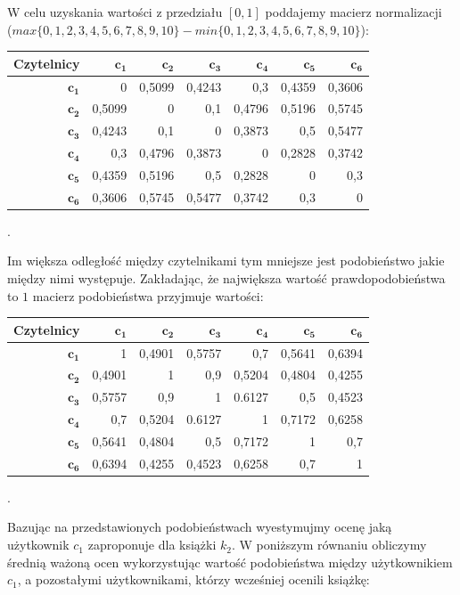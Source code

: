 \documentclass[12pt,a4paper]{report}
\begin{document}
W celu uzyskania wartości z przedziału $[0,1]$ poddajemy macierz normalizacji 
\\($max\{0,1,2,3,4,5,6,7,8,9,10\} - min\{0,1,2,3,4,5,6,7,8,9,10\}$):
\begin{center}
\begin{tabular}{|r|r|r|r|r|r|r|} \hline
\textbf{Czytelnicy} & $\mathbf{c_1}$ & $\mathbf{c_2}$ & $\mathbf{c_3}$ & $\mathbf{c_4}$ & $\mathbf{c_5}$ & $\mathbf{c_6}$\\
\hline
$\mathbf{c_1}$ & 0 & 0,5099 & 0,4243 & 0,3 & 0,4359 & 0,3606 \\
\hline
$\mathbf{c_2}$ & 0,5099 & 0 & 0,1 & 0,4796 & 0,5196 & 0,5745\\
\hline
$\mathbf{c_3}$ & 0,4243 & 0,1 & 0 & 0,3873 & 0,5 & 0,5477\\
\hline
$\mathbf{c_4}$ & 0,3 & 0,4796 & 0,3873 & 0 & 0,2828 & 0,3742 \\
\hline 
$\mathbf{c_5}$ & 0,4359 & 0,5196 & 0,5 & 0,2828 & 0 & 0,3 \\
\hline 
$\mathbf{c_6}$ & 0,3606 & 0,5745 & 0,5477 & 0,3742 & 0,3 & 0 \\
\hline 
\end{tabular}.
\end{center}
Im większa odległość między czytelnikami tym mniejsze jest podobieństwo jakie między nimi występuje.
Zakładając, że największa wartość prawdopodobieństwa to $1$ macierz podobieństwa przyjmuje wartości:
\begin{center}
\begin{tabular}{|r|r|r|r|r|r|r|} \hline
\textbf{Czytelnicy} & $\mathbf{c_1}$ & $\mathbf{c_2}$ & $\mathbf{c_3}$ & $\mathbf{c_4}$ & $\mathbf{c_5}$ & $\mathbf{c_6}$\\
\hline
$\mathbf{c_1}$ & 1 & 0,4901 & 0,5757 & 0,7 & 0,5641 & 0,6394 \\
\hline
$\mathbf{c_2}$ & 0,4901 & 1 & 0,9 & 0,5204 & 0,4804 & 0,4255\\
\hline
$\mathbf{c_3}$ & 0,5757 & 0,9 & 1 & 0.6127 & 0,5 & 0,4523\\
\hline
$\mathbf{c_4}$ & 0,7 & 0,5204 & 0.6127 & 1 & 0,7172 & 0,6258 \\
\hline 
$\mathbf{c_5}$ & 0,5641 & 0,4804 & 0,5 & 0,7172 & 1 & 0,7 \\
\hline 
$\mathbf{c_6}$ & 0,6394 & 0,4255 & 0,4523 & 0,6258 & 0,7 & 1 \\
\hline 
\end{tabular}.
\end{center}
Bazując na przedstawionych podobieństwach wyestymujmy ocenę jaką użytkownik $c_1$ zaproponuje dla książki $k_2$. W poniższym równaniu obliczymy średnią ważoną ocen wykorzystując wartość podobieństwa między użytkownikiem $c_1$, a pozostałymi użytkownikami, którzy wcześniej ocenili książkę:
\end{document}
